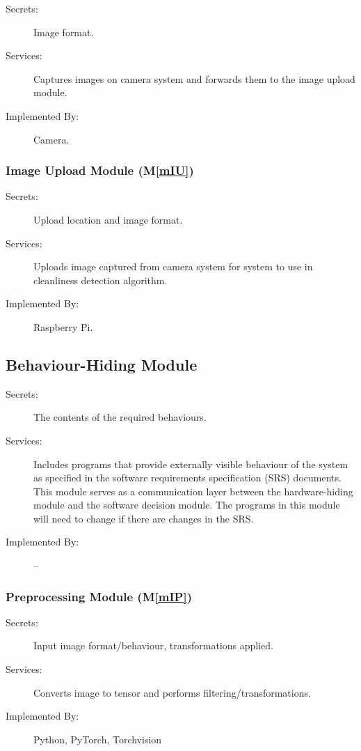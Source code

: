 \documentclass[12pt, titlepage]{article}
\newcommand{\mref}[1]{M\ref{#1}}
\begin{document}
\begin{description}
\item[Secrets:] Image format.
\item[Services:] Captures images on camera system and forwards them to the image upload module.
\item[Implemented By:] Camera.
\end{description}

\subsubsection{Image Upload Module (\mref{mIU})}

\begin{description}
\item[Secrets:] Upload location and image format.
\item[Services:] Uploads image captured from camera system for system to use in cleanliness detection algorithm.
\item[Implemented By:] Raspberry Pi.
\end{description}

\subsection{Behaviour-Hiding Module}

\begin{description}
\item[Secrets:]The contents of the required behaviours.
\item[Services:]Includes programs that provide externally visible behaviour of
  the system as specified in the software requirements specification (SRS)
  documents. This module serves as a communication layer between the
  hardware-hiding module and the software decision module. The programs in this
  module will need to change if there are changes in the SRS.
\item[Implemented By:] --
\end{description}


\subsubsection{Preprocessing Module (\mref{mIP})}

\begin{description}
\item[Secrets:]Input image format/behaviour, transformations applied.
\item[Services:]Converts image to tensor and performs filtering/transformations. 
\item[Implemented By:]Python, PyTorch, Torchvision
\end{description}
\end{document}
